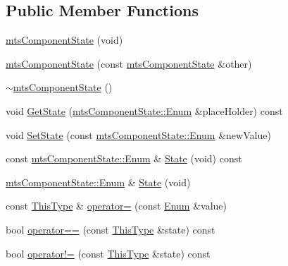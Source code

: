 \subsection*{Public Member Functions}
\begin{DoxyCompactItemize}
\item 
\hyperlink{classmts_component_state_a5d94efa3f7027b9609f8be0825e41bb5}{mts\+Component\+State} (void)
\item 
\hyperlink{classmts_component_state_ae9120825a419a33ac088ca55282ebbe5}{mts\+Component\+State} (const \hyperlink{classmts_component_state}{mts\+Component\+State} \&other)
\item 
\hyperlink{classmts_component_state_a0b0f5c15b7e192a2b907f9f0049d6c4b}{$\sim$mts\+Component\+State} ()
\item 
void \hyperlink{classmts_component_state_a3e202dfc34bdd1e78f180dd4444a8e78}{Get\+State} (\hyperlink{classmts_component_state_a1158e4d2d79fff671354909e87f58928}{mts\+Component\+State\+::\+Enum} \&place\+Holder) const 
\item 
void \hyperlink{classmts_component_state_a108ea13e012e621442979fc1c86172ea}{Set\+State} (const \hyperlink{classmts_component_state_a1158e4d2d79fff671354909e87f58928}{mts\+Component\+State\+::\+Enum} \&new\+Value)
\item 
const \hyperlink{classmts_component_state_a1158e4d2d79fff671354909e87f58928}{mts\+Component\+State\+::\+Enum} \& \hyperlink{classmts_component_state_a11adc28d39ad4f73bca5549e05dfa8c5}{State} (void) const 
\item 
\hyperlink{classmts_component_state_a1158e4d2d79fff671354909e87f58928}{mts\+Component\+State\+::\+Enum} \& \hyperlink{classmts_component_state_a6613d98a018b9dd67693345b12109266}{State} (void)
\item 
const \hyperlink{classmts_component_state_a668efaf1bf3c84a5448587f04d7312b5}{This\+Type} \& \hyperlink{classmts_component_state_a7387f2b8e4a75d4b2bfb6a247abba004}{operator=} (const \hyperlink{classmts_component_state_a1158e4d2d79fff671354909e87f58928}{Enum} \&value)
\item 
bool \hyperlink{classmts_component_state_aa8299cf9da4ae26a30061b0a0072f5c3}{operator==} (const \hyperlink{classmts_component_state_a668efaf1bf3c84a5448587f04d7312b5}{This\+Type} \&state) const 
\item 
bool \hyperlink{classmts_component_state_afd18affcda0e1c5d2c258562f7ef016e}{operator!=} (const \hyperlink{classmts_component_state_a668efaf1bf3c84a5448587f04d7312b5}{This\+Type} \&state) const 
\item 

\end{DoxyCompactItemize}
